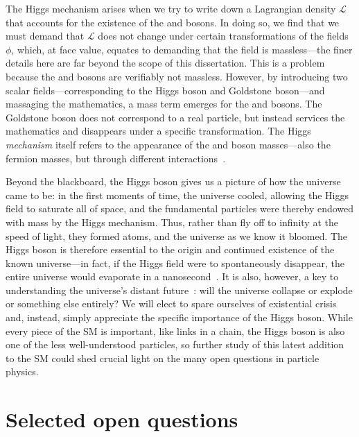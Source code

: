 The Higgs mechanism arises when we try to write down a Lagrangian density $\mathcal{L}$ that accounts for the existence of the \PW and \PZ bosons. 
In doing so, we find that we must demand that $\mathcal{L}$ does not change under certain transformations of the fields $\phi$, which, at face value, equates to demanding that the field is massless---the finer details here are far beyond the scope of this dissertation. 
This is a problem because the \PW and \PZ bosons are verifiably not massless. 
However, by introducing two scalar fields---corresponding to the Higgs boson and Goldstone boson---and massaging the mathematics, a mass term emerges for the \PW and \PZ bosons. 
The Goldstone boson does not correspond to a real particle, but instead services the mathematics\footnotemark{} and disappears under a specific transformation. 
The Higgs \textit{mechanism} itself refers to the appearance of the \PW and \PZ boson masses---also the fermion masses, but through different interactions~\cite{Weinberg:1967tq, Nambu:1961fr}. 

Beyond the blackboard, the Higgs boson gives us a picture of how the universe came to be: in the first moments of time, the universe cooled, allowing the Higgs field to saturate all of space, and the fundamental particles were thereby endowed with mass by the Higgs mechanism. 
Thus, rather than fly off to infinity at the speed of light, they formed atoms, and the universe as we know it bloomed.  
The Higgs boson is therefore essential to the origin and continued existence of the known universe---in fact, if the Higgs field were to spontaneously disappear, the entire universe would evaporate in a nanosecond~\cite{P5Report}. 
It is also, however, a key to understanding the universe's distant future~\cite{Bass2021}: will the universe collapse or explode or something else entirely? 
We will elect to spare ourselves of existential crisis and, instead, simply appreciate the specific importance of the Higgs boson. 
While every piece of the SM is important, like links in a chain, the Higgs boson is also one of the less well-understood particles, so further study of this latest addition to the SM could shed crucial light on the many open questions in particle physics. 

\section{Selected open questions}\label{sec:open_questions}
